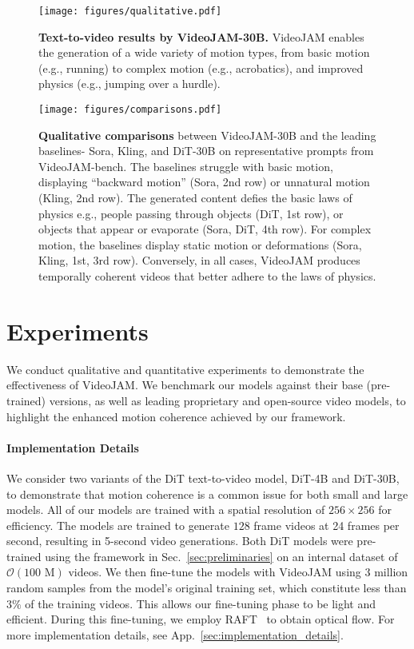 \begin{figure*}[ht!]
\centering
\texttt{[image: figures/qualitative.pdf]}
\vspace{-26px}
\caption{\textbf{Text-to-video results by VideoJAM-30B.} VideoJAM enables the generation of a wide variety of motion types, from basic motion (e.g., running) to complex motion (e.g., acrobatics), and improved physics (e.g., jumping over a hurdle). }
\label{fig:qualitative}
\vspace{-4px}
\end{figure*}

\begin{figure*}[h!]
\centering
\texttt{[image: figures/comparisons.pdf]}
\vspace{-26px}
\caption{\textbf{Qualitative comparisons} between VideoJAM-30B and the leading baselines- Sora, Kling, and DiT-30B on representative prompts from VideoJAM-bench. The baselines struggle with basic motion, displaying ``backward motion'' (Sora, 2nd row) or unnatural motion (Kling, 2nd row). The generated content defies the basic laws of physics e.g., people passing through objects (DiT, 1st row), or objects that appear or evaporate (Sora, DiT, 4th row). For complex motion, the baselines display static motion or deformations (Sora, Kling, 1st, 3rd row). Conversely, in all cases, VideoJAM produces temporally coherent videos that better adhere to the laws of physics.}
\label{fig:comparisons}
\vspace{-10px}
\end{figure*}
\section{Experiments}
\label{sec:experiments}

We conduct qualitative and quantitative experiments to demonstrate the effectiveness of VideoJAM. We benchmark our models against their base (pre-trained) versions, as well as leading proprietary and open-source video models, to highlight the enhanced motion coherence achieved by our framework.

\paragraph{Implementation Details} 
We consider two variants of the DiT text-to-video model, DiT-4B and DiT-30B, to demonstrate that motion coherence is a common issue for both small and large models. All of our models are trained with a spatial resolution of $256\times 256$ for efficiency. The models are trained to generate $128$ frame videos at 24 frames per second, resulting in 5-second video generations. Both DiT models were pre-trained using the framework in Sec.~\ref{sec:preliminaries} on an internal dataset of $\mathcal{O}(100 \text{ M})$ videos. We then fine-tune the models with VideoJAM using $3$ million random samples from the model's original training set, which constitute less than $3\%$ of the training videos. This allows our fine-tuning phase to be light and efficient. During this fine-tuning, we employ RAFT~\cite{raft} to obtain optical flow.
For more implementation details, see App.~\ref{sec:implementation_details}.

